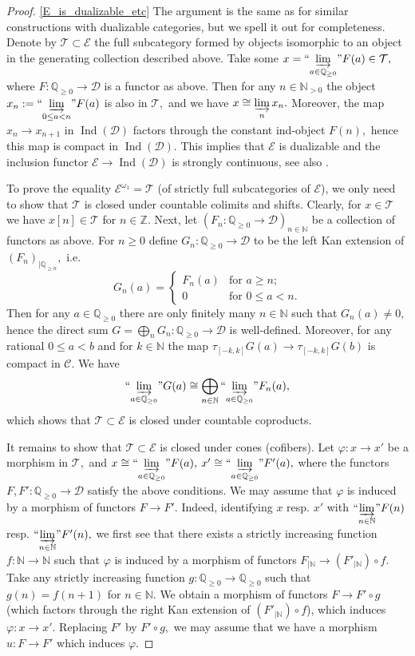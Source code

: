 \documentclass[11pt,leqno]{amsart}
\numberwithin{equation}{section}
\def\N{\mathbb{N}}
\def\Z{\mathbb{Z}}
\def\Q{\mathbb{Q}}
\newcommand{\indlim}[1][]{\mathop{\varinjlim}\limits_{#1}}
\newcommand{\inddlim}[1][]{{``{\indlim[#1]}"}}
\newcommand{\biggplus}[1][]{\mathop{\bigoplus}\limits_{#1}}
\newcommand{\cD}{{\mathcal D}}
\newcommand{\cC}{{\mathcal C}}
\newcommand{\cE}{{\mathcal E}}
\newcommand{\cT}{{\mathcal T}}
\newcommand{\Ind}{\operatorname{Ind}}
\begin{document}
\begin{proof}
\ref{E_is_dualizable_etc} The argument is the same as for similar constructions with dualizable categories, but we spell it out for completeness. Denote by $\cT\subset\cE$ the full subcategory formed by objects isomorphic to an object in the generating collection described above. Take some $x=\inddlim[a\in \Q_{\geq 0}]F(a)\in\cT,$ where $F:\Q_{\geq 0}\to\cD$ is a functor as above. Then for any $n\in\N_{>0}$ the object $x_n:=\inddlim[0\leq a<n]F(a)$ is also in $\cT,$ and we have $x\cong\indlim[n]x_n.$ Moreover, the map $x_n\to x_{n+1}$ in $\Ind(\cD)$ factors through the constant ind-object $F(n),$ hence this map is compact in $\Ind(\cD).$ This implies that $\cE$ is dualizable and the inclusion functor $\cE\to \Ind(\cD)$ is strongly continuous, see also \cite[Lemma1.83 and its proof]{E24}.

To prove the equality $\cE^{\omega_1}=\cT$ (of strictly full subcategories of $\cE$), we only need to show that $\cT$ is closed under countable colimits and shifts. Clearly, for $x\in\cT$ we have $x[n]\in\cT$ for $n\in\Z.$ Next, let $(F_n:\Q_{\geq 0}\to\cD)_{n\in \N}$ be a collection of functors as above. For $n\geq 0$ define $G_n:\Q_{\geq 0}\to \cD$ to be the left Kan extension of $(F_n)_{\mid \Q_{\geq n}},$ i.e. 
\begin{equation*}
G_n(a)=\begin{cases}F_n(a) & \text{for }a\geq n;\\
0 & \text{for }0\leq a<n.\end{cases} 
\end{equation*}
Then for any $a\in\Q_{\geq 0}$ there are only finitely many $n\in\N$ such that $G_n(a)\ne 0,$ hence the direct sum $G=\biggplus[n]G_n:\Q_{\geq 0}\to\cD$ is well-defined. Moreover, for any rational $0\leq a<b$ and for $k\in\N$ the map $\tau_{[-k,k]}G(a)\to\tau_{[-k,k]}G(b)$ is compact in $\cC.$ We have
\begin{equation*}
\inddlim[a\in\Q_{\geq 0}]G(a)\cong\biggplus[n\in\N]\inddlim[a\in\Q_{\geq 0}]F_n(a),
\end{equation*}
which shows that $\cT\subset\cE$ is closed under countable coproducts. 

It remains to show that $\cT\subset\cE$ is closed under cones (cofibers). Let $\varphi:x\to x'$ be a morphism in $\cT,$ and $x\cong \inddlim[a\in\Q_{\geq 0}]F(a),$ $x'\cong \inddlim[a\in\Q_{\geq 0}]F'(a),$ where the functors $F,F':\Q_{\geq 0}\to \cD$ satisfy the above conditions. We may assume that $\varphi$ is induced by a morphism of functors $F\to F'.$ Indeed, identifying $x$ resp. $x'$ with $\inddlim[n\in\N]F(n)$ resp. $\inddlim[n\in\N]F'(n),$ we first see that there exists a strictly increasing function $f:\N\to\N$ such that $\varphi$ is induced by a morphism of functors $F_{\mid\N}\to (F'_{\mid \N})\circ f.$ Take any strictly increasing function $g:\Q_{\geq 0}\to \Q_{\geq 0}$ such that $g(n)=f(n+1)$ for $n\in\N.$ We obtain a morphism of functors $F\to F'\circ g$ (which factors through the right Kan extension of $(F'_{\mid \N})\circ f$), which induces $\varphi:x\to x'.$ Replacing $F'$ by $F'\circ g,$ we may assume that we have a morphism $u:F\to F'$ which induces $\varphi.$


\end{proof}
\end{document}
